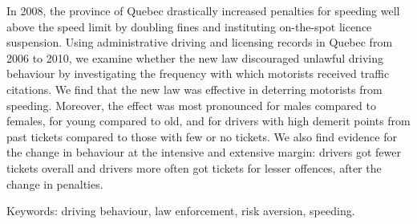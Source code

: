 

In 2008, the province of Quebec drastically increased penalties for speeding 
well above the speed limit by doubling fines and instituting on-the-spot licence suspension. 
Using administrative driving and licensing records in Quebec from 2006 to 2010, 
we examine whether the new law discouraged unlawful driving behaviour 
by investigating the frequency with which motorists received traffic citations. 
We find that the new law was effective in deterring motorists from speeding.
Moreover, the effect was most pronounced for males compared to females, 
for young compared to old, and for drivers with high demerit points from past
tickets compared to those with few or no tickets. 
We also find evidence for the change in behaviour at the intensive and extensive margin:
drivers got fewer tickets overall
and drivers more often got tickets for lesser offences, 
after the change in penalties. 


\medskip
\noindent
Keywords: driving behaviour, law enforcement, risk aversion, speeding.
